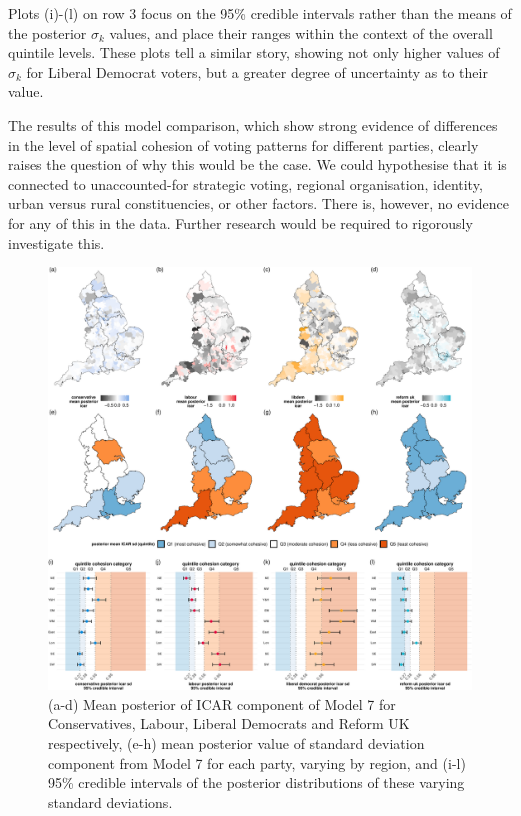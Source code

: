 \documentclass[webpdf,large,contemporary,namedate]{oup-authoring-template}
\theoremstyle{thmstyleone}
\theoremstyle{thmstyletwo}
\theoremstyle{thmstylethree}
\begin{document}
Plots (i)-(l) on row 3 focus on the 95\% credible intervals rather than
the means of the posterior \(\sigma_k\) values, and place their ranges
within the context of the overall quintile levels. These plots tell a
similar story, showing not only higher values of \(\sigma_k\) for
Liberal Democrat voters, but a greater degree of uncertainty as to their
value.

The results of this model comparison, which show strong evidence of
differences in the level of spatial cohesion of voting patterns for
different parties, clearly raises the question of why this would be the
case. We could hypothesise that it is connected to unaccounted-for
strategic voting, regional organisation, identity, urban versus rural
constituencies, or other factors. There is, however, no evidence for any
of this in the data. Further research would be required to rigorously
investigate this.

\begin{figure}[th]
\includegraphics[width=1\linewidth]{jrss_resubmission_files/figure-latex/figspatialposts-1} \caption{(a-d) Mean posterior of ICAR component of Model 7 for Conservatives, Labour, Liberal Democrats and Reform UK respectively, (e-h) mean posterior value of standard deviation component from Model 7 for each party, varying by region, and (i-l) 95\% credible intervals of the posterior distributions of these varying standard deviations.}\label{fig:figspatialposts}
\end{figure}
\end{document}
